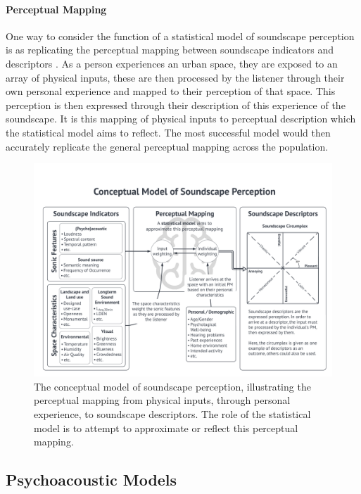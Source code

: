 \citep{Lionello2020systematic}

\paragraph*{Perceptual Mapping}
One way to consider the function of a statistical model of soundscape perception is as replicating the perceptual mapping between soundscape indicators and descriptors \citep{Lionello2021Thesis}. As a person experiences an urban space, they are exposed to an array of physical inputs, these are then processed by the listener through their own personal experience and mapped to their perception of that space. This perception is then expressed through their description of this experience of the soundscape. It is this mapping of physical inputs to perceptual description which the statistical model aims to reflect. The most successful model would then accurately replicate the general perceptual mapping across the population.

\begin{figure}
  \includegraphics[width=\textwidth]{Figures/Overall Model Concept Diagram_2022-04-28.png}
  \caption{The conceptual model of soundscape perception, illustrating the perceptual mapping from physical inputs, through personal experience, to soundscape descriptors. The role of the statistical model is to attempt to approximate or reflect this perceptual mapping. \label{fig:percepMap}}
\end{figure}

\subsection{Psychoacoustic Models}


